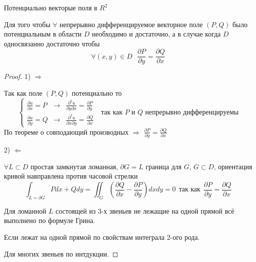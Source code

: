 \begin{title}[\Large]
  Потенциально векторые поля в $R^2$
\end{title}

\begin{block}
  Для того чтобы $\forall$ непрерывно дифференцируемое векторное поле $(P, Q)$
  было потенциальным в области $D$ необходимо и достаточно, а в случае когда
  $D$ односвязанно достаточно чтобы
  $$
  \forall (x,y) \in D  ~~~ \frac{\partial P}{\partial y} =
  \frac{\partial Q}{\partial x}
  $$
\end{block}

\begin{proof}
  1) $\Rightarrow$

  Так как поле $(P,Q)$ потенциально то
  $$
  \left\{
  \begin{array}{lcl}
    \frac{\partial u}{\partial x} = P & \to &
    \frac{\partial^2 u}{\partial y \partial x} =
    \frac{\partial P}{\partial y} \\
    \frac{\partial u}{\partial y} = Q & \to &
    \frac{\partial^2 u}{\partial x \partial y} =
    \frac{\partial Q}{\partial x}
  \end{array}
  \right. ~~~ \text{так как $P$ и $Q$ непрерывно дифференцируемы}
  $$
  По теореме о совподающий производных $\Rightarrow$
  $\frac{\partial P}{\partial y} = \frac{\partial Q}{\partial x}$

  2) $\Leftarrow$

  $\forall L \subset D$ простая замкнутая ломанная, $\partial G = L$ граница
  для $G$, $G \subset D$, ориентация кривой навправлена против часовой стрелки
  $$
  \int_{L = \partial G} Pdx + Qdy =
  \iint_G \left( \frac{\partial Q}{\partial x} -
  \frac{\partial P}{\partial y} \right) dx dy = 0
  ~~ \text{так как} ~~
  \frac{\partial P}{\partial y} = \frac{\partial Q}{\partial x}
  $$

  Для ломанной $L$ состоящей из 3-х звеньев не лежащие на одной прямой всё
  выполнено по формуле Грина.

  Если лежат на одной прямой по свойствам интеграла 2-ого рода.

  Для многих звеньев по интдукции.
\end{proof}
